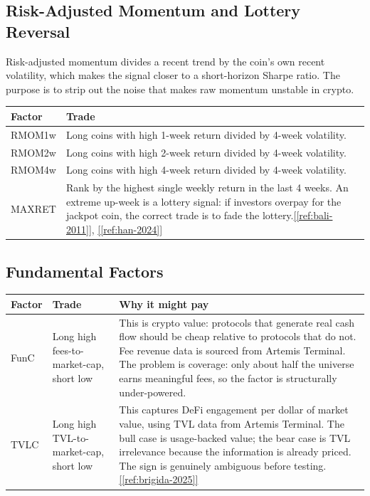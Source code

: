 \documentclass[11pt,a4paper]{article}
\newcommand{\ieeecite}[1]{\hyperref[ref:#1]{[\ref*{ref:#1}]}}
\newcommand{\ieeecitetwo}[2]{\hyperref[ref:#1]{[\ref*{ref:#1}]}, \hyperref[ref:#2]{[\ref*{ref:#2}]}}
\begin{document}
\subsection{Risk-Adjusted Momentum and Lottery Reversal}

Risk-adjusted momentum divides a recent trend by the coin's own recent volatility, which makes the signal closer to a short-horizon Sharpe ratio. The purpose is to strip out the noise that makes raw momentum unstable in crypto.

\begin{center}
\small
\begin{tabularx}{\textwidth}{L{0.16\textwidth}X}
\toprule
{}
\textbf{Factor} & \textbf{Trade} \\
\midrule
RMOM1w & Long coins with high 1-week return divided by 4-week volatility. \\
RMOM2w & Long coins with high 2-week return divided by 4-week volatility. \\
RMOM4w & Long coins with high 4-week return divided by 4-week volatility. \\
MAXRET & Rank by the highest single weekly return in the last 4 weeks. An extreme up-week is a lottery signal: if investors overpay for the jackpot coin, the correct trade is to fade the lottery.\ieeecitetwo{bali-2011}{han-2024} \\
\bottomrule
\end{tabularx}
\end{center}

\subsection{Fundamental Factors}

\begin{center}
\small
\begin{tabularx}{\textwidth}{L{0.14\textwidth}L{0.25\textwidth}X}
\toprule
{}
\textbf{Factor} & \textbf{Trade} & \textbf{Why it might pay} \\
\midrule
FunC & Long high fees-to-market-cap, short low & This is crypto value: protocols that generate real cash flow should be cheap relative to protocols that do not. Fee revenue data is sourced from Artemis Terminal. The problem is coverage: only about half the universe earns meaningful fees, so the factor is structurally under-powered. \\
TVLC & Long high TVL-to-market-cap, short low & This captures DeFi engagement per dollar of market value, using TVL data from Artemis Terminal. The bull case is usage-backed value; the bear case is TVL irrelevance because the information is already priced. The sign is genuinely ambiguous before testing.\ieeecite{brigida-2025} \\
\bottomrule
\end{tabularx}
\end{center}
\end{document}
